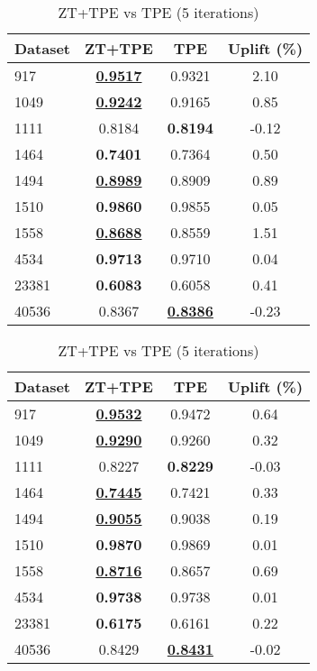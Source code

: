 \begin{table}[htbp]
\begin{center}
\begin{small}
\begin{sc}
\begin{subtable}[t]{0.48\textwidth}
    \centering
    \caption{ZT+TPE vs TPE (1 iteration)}
    \label{tab:randomforest-optuna-1}
    \begin{tabular}{lccc}
    \toprule
    \textbf{Dataset} & \textbf{ZT+TPE} & \textbf{TPE} & \textbf{Uplift (\%)} \\
    \midrule
    917    & \underline{\textbf{0.9517}} & 0.9321 & 2.10 \\
    1049    & \underline{\textbf{0.9242}} & 0.9165 & 0.85 \\
    1111    & 0.8184 & \textbf{0.8194} & -0.12 \\
    1464    & \textbf{0.7401} & 0.7364 & 0.50 \\
    1494    & \underline{\textbf{0.8989}} & 0.8909 & 0.89 \\
    1510    & \textbf{0.9860} & 0.9855 & 0.05 \\
    1558    & \underline{\textbf{0.8688}} & 0.8559 & 1.51 \\
    4534    & \textbf{0.9713} & 0.9710 & 0.04 \\
    23381    & \textbf{0.6083} & 0.6058 & 0.41 \\
    40536    & 0.8367 & \underline{\textbf{0.8386}} & -0.23 \\
    \bottomrule
    \end{tabular}
\end{subtable}
\hfill
\begin{subtable}[t]{0.48\textwidth}
    \centering
    \caption{ZT+TPE vs TPE (5 iterations)}
    \label{tab:randomforest-optuna-5}
    \begin{tabular}{lccc}
    \toprule
    \textbf{Dataset} & \textbf{ZT+TPE} & \textbf{TPE} & \textbf{Uplift (\%)} \\
    \midrule
    917    & \underline{\textbf{0.9532}} & 0.9472 & 0.64 \\
    1049    & \underline{\textbf{0.9290}} & 0.9260 & 0.32 \\
    1111    & 0.8227 & \textbf{0.8229} & -0.03 \\
    1464    & \underline{\textbf{0.7445}} & 0.7421 & 0.33 \\
    1494    & \underline{\textbf{0.9055}} & 0.9038 & 0.19 \\
    1510    & \textbf{0.9870} & 0.9869 & 0.01 \\
    1558    & \underline{\textbf{0.8716}} & 0.8657 & 0.69 \\
    4534    & \textbf{0.9738} & 0.9738 & 0.01 \\
    23381    & \textbf{0.6175} & 0.6161 & 0.22 \\
    40536    & 0.8429 & \underline{\textbf{0.8431}} & -0.02 \\
    \bottomrule
    \end{tabular}
\end{subtable}


\end{sc}
\end{small}
\end{center}
\end{table}
